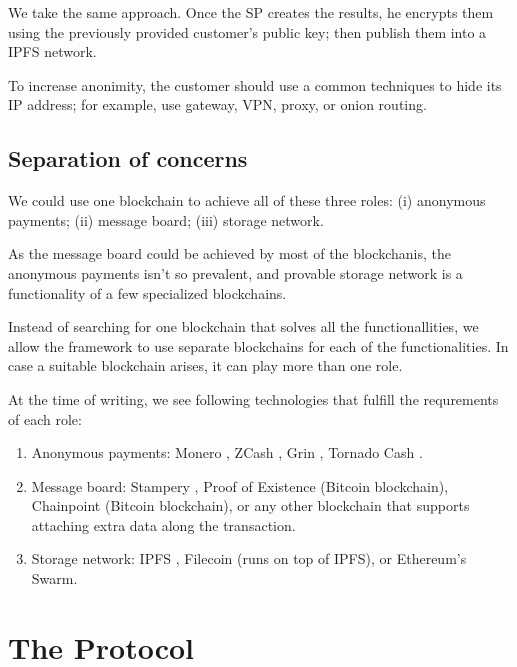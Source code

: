 \documentclass{ieeeaccess}
\begin{document}
We take the same approach. Once the SP creates the results, he encrypts
them using the previously provided customer's public key; then publish
them into a IPFS network.

To increase anonimity, the customer should use a common techniques to
hide its IP address; for example, use gateway, VPN, proxy, or onion
routing.

\subsection{Separation of concerns}
We could use one blockchain to achieve all of these three roles: (i)
anonymous payments; (ii) message board; (iii) storage network.

As the message board could be achieved by most of the blockchanis, the
anonymous payments isn't so prevalent, and provable storage network is a
functionality of a few specialized blockchains.

Instead of searching for one blockchain that solves all the
functionallities, we allow the framework to use separate blockchains for
each of the functionalities. In case a suitable blockchain arises, it
can play more than one role.

At the time of writing, we see following technologies that fulfill the
requrements of each role:

\begin{enumerate}
\def\labelenumi{\arabic{enumi}.}

\item Anonymous payments: Monero \cite{van2013cryptonote}, ZCash
  \cite{sasson2014zerocash}, Grin \cite{fuchsbauer2019aggregate},
  Tornado Cash \cite{pertsev2019tornado}.
\item Message board: Stampery \cite{de2016stampery}, Proof of Existence
  \cite{proofofexistence} (Bitcoin blockchain), Chainpoint
  \cite{Chainpoi39} (Bitcoin blockchain), or any other blockchain that
  supports attaching extra data along the transaction.
\item Storage network: IPFS \cite{benet2014ipfs}, Filecoin
  \cite{benetfilecoin} (runs on top of IPFS), or Ethereum's
  Swarm\cite{swarmwhi49}.
\end{enumerate}



\section{The Protocol}
\end{document}
